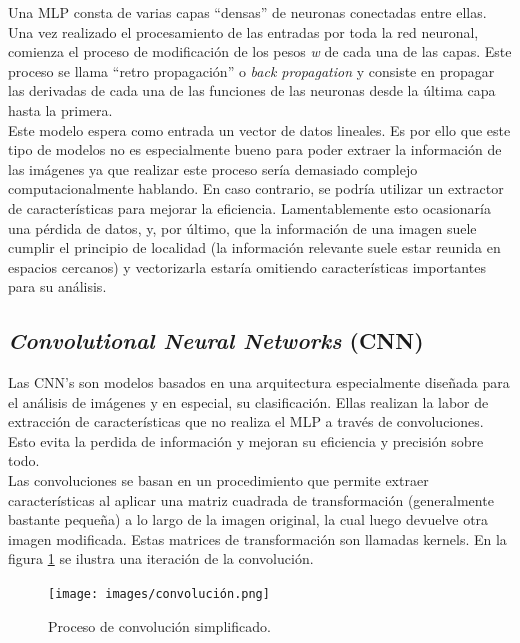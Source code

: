 Una MLP consta de varias capas ``densas'' de neuronas conectadas entre ellas. Una vez 
realizado el procesamiento de las entradas por toda la red neuronal, comienza el 
proceso de modificación de los pesos \textit{w} de cada una de las capas. Este proceso 
se llama ``retro propagación'' o \textit{back propagation} y consiste en propagar las 
derivadas de cada una de las funciones de las neuronas desde la última capa hasta 
la primera.\\

Este modelo espera como entrada un vector de datos lineales. Es por ello que este tipo 
de modelos no es especialmente bueno para poder extraer la información de las imágenes 
ya que realizar este proceso sería demasiado complejo computacionalmente hablando. 
En caso contrario, se podría utilizar un extractor de características para mejorar la 
eficiencia. Lamentablemente esto ocasionaría una pérdida de datos, y, por último, 
que la información de una imagen suele cumplir el principio de localidad (la información 
relevante suele estar reunida en espacios cercanos) y vectorizarla estaría omitiendo 
características importantes para su análisis.

\subsection{\textit{Convolutional Neural Networks} (CNN)}

Las CNN's son modelos basados en una arquitectura especialmente diseñada para el 
análisis de imágenes y en especial, su clasificación. Ellas realizan la labor de 
extracción de características que no realiza el MLP a través de convoluciones. Esto 
evita la perdida de información y mejoran su eficiencia y precisión sobre todo. \\

Las convoluciones se basan en un procedimiento que permite extraer características al 
aplicar una matriz cuadrada de transformación (generalmente bastante pequeña) a lo 
largo de la imagen original, la cual luego devuelve otra imagen modificada. Estas 
matrices de transformación son llamadas kernels. En la figura \ref{convolucion} se 
ilustra una iteración de la convolución.
\\
\begin{figure}[h!]
\texttt{[image: images/convolución.png]}
\centering
\caption{Proceso de convolución simplificado\cite{convoluciones}.}
\label{convolucion}
\end{figure}

